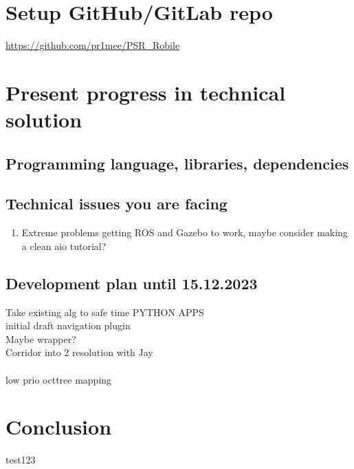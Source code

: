 \documentclass[11pt,a4paper]{article}
\begin{document}
\section{Setup GitHub/GitLab repo}
\url{https://github.com/pr1mee/PSR_Robile}

\section{Present progress in technical solution}

\subsection{Programming language, libraries, dependencies}
\subsection{Technical issues you are facing}
\begin {enumerate}
\item Extreme problems getting ROS and Gazebo to work, maybe consider making a clean aio tutorial?
\end{enumerate}
\subsection{Development plan until 15.12.2023}
Take existing alg to safe time PYTHON APPS\\
initial draft navigation plugin\\
Maybe wrapper?\\
Corridor into 2 resolution with Jay
\\\\low prio
octtree mapping\\

\section{Conclusion}
% 
% 
test123
\end{document}
